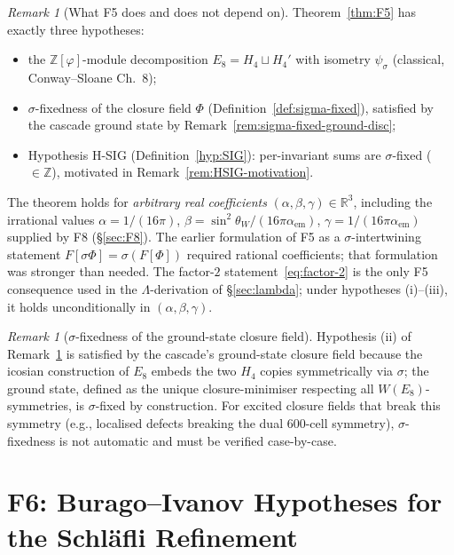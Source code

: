 \documentclass[12pt]{article}
\theoremstyle{definition}
\theoremstyle{remark}
\newtheorem{remark}[theorem]{Remark}
\newcommand{\Zphi}{\mathbb{Z}[\varphi]}
\begin{document}
\begin{remark}[What F5 does and does not depend on]\label{rem:F5-hypotheses}
Theorem~\ref{thm:F5} has exactly three hypotheses:
\begin{itemize}
\item[(i)] the $\Zphi$-module decomposition $E_8 = H_4 \sqcup H_4'$ with isometry $\psi_\sigma$ (classical, Conway--Sloane Ch.~8);
\item[(ii)] $\sigma$-fixedness of the closure field $\Phi$ (Definition~\ref{def:sigma-fixed}), satisfied by the cascade ground state by Remark~\ref{rem:sigma-fixed-ground-disc};
\item[(iii)] Hypothesis H-SIG (Definition~\ref{hyp:SIG}): per-invariant sums are $\sigma$-fixed ($\in \mathbb{Z}$), motivated in Remark~\ref{rem:HSIG-motivation}.
\end{itemize}
The theorem holds for \emph{arbitrary real coefficients} $(\alpha, \beta, \gamma) \in \mathbb{R}^3$, including the irrational values $\alpha = 1/(16\pi)$, $\beta = \sin^2\theta_W / (16\pi\alpha_{\mathrm{em}})$, $\gamma = 1/(16\pi\alpha_{\mathrm{em}})$ supplied by F8 (\S\ref{sec:F8}). The earlier formulation of F5 as a $\sigma$-intertwining statement $F[\sigma\Phi] = \sigma(F[\Phi])$ required rational coefficients; that formulation was stronger than needed. The factor-$2$ statement~\eqref{eq:factor-2} is the only F5 consequence used in the $\Lambda$-derivation of \S\ref{sec:lambda}; under hypotheses (i)--(iii), it holds unconditionally in $(\alpha, \beta, \gamma)$.
\end{remark}

\begin{remark}[$\sigma$-fixedness of the ground-state closure field]\label{rem:sigma-fixed-ground}
Hypothesis (ii) of Remark~\ref{rem:F5-hypotheses} is satisfied by the cascade's ground-state closure field because the icosian construction of $E_8$ embeds the two $H_4$ copies symmetrically via $\sigma$; the ground state, defined as the unique closure-minimiser respecting all $W(E_8)$-symmetries, is $\sigma$-fixed by construction. For excited closure fields that break this symmetry (e.g., localised defects breaking the dual 600-cell symmetry), $\sigma$-fixedness is not automatic and must be verified case-by-case.
\end{remark}


\section{F6: Burago--Ivanov Hypotheses for the Schl\"afli Refinement}\label{sec:F6}
\end{document}
